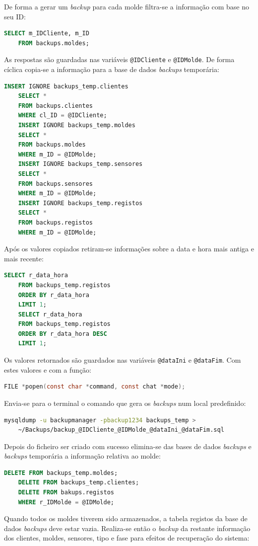 \documentclass[11pt,twoside,a4paper]{report}
\begin{document}
De forma a gerar um \textit{backup} para cada molde filtra-se a informação com base no seu ID:
\begin{lstlisting}[language = SQL]
	SELECT m_IDCliente, m_ID
	FROM backups.moldes;
\end{lstlisting}
As respostas são guardadas nas variáveis \texttt{@IDCliente} e \texttt{@IDMolde}. De forma cíclica copia-se a informação para a base de dados \textit{backups} temporária:
\begin{lstlisting}[language = SQL]
	INSERT IGNORE backups_temp.clientes
	SELECT *
	FROM backups.clientes
	WHERE cl_ID = @IDCliente;
	INSERT IGNORE backups_temp.moldes
	SELECT *
	FROM backups.moldes
	WHERE m_ID = @IDMolde;
	INSERT IGNORE backups_temp.sensores
	SELECT *
	FROM backups.sensores
	WHERE m_ID = @IDMolde;
	INSERT IGNORE backups_temp.registos
	SELECT *
	FROM backups.registos
	WHERE m_ID = @IDMolde;
\end{lstlisting}
Após os valores copiados retiram-se informações sobre a data e hora mais antiga e mais recente:
\begin{lstlisting}[language = SQL]
	SELECT r_data_hora
	FROM backups_temp.registos
	ORDER BY r_data_hora
	LIMIT 1;
	SELECT r_data_hora
	FROM backups_temp.registos
	ORDER BY r_data_hora DESC
	LIMIT 1;
\end{lstlisting}
Os valores retornados são guardados nas variáveis \texttt{@dataIni} e \texttt{@dataFim}. Com estes valores e com a função:
\begin{lstlisting}[language = C]
	FILE *popen(const char *command, const chat *mode);
\end{lstlisting}
Envia-se para o terminal o comando que gera os \textit{backups} num local predefinido:
\begin{lstlisting}[language = bash]
	mysqldump -u backupmanager -pbackup1234 backups_temp >
	~/Backups/backup_@IDCliente_@IDMolde_@dataIni_@dataFim.sql
\end{lstlisting}
Depois do ficheiro ser criado com sucesso elimina-se das bases de dados \textit{backups} e \textit{backups} temporária a informação relativa ao molde:
\begin{lstlisting}[language = SQL]
	DELETE FROM backups_temp.moldes;
	DELETE FROM backups_temp.clientes;
	DELETE FROM bakups.registos
	WHERE r_IDMolde = @IDMolde;
\end{lstlisting}
Quando todos os moldes tiverem sido armazenados, a tabela registos da base de dados \textit{backups} deve estar vazia. Realiza-se então o \textit{backup} da restante informação dos clientes, moldes, sensores, tipo e fase para efeitos de recuperação do sistema:
\end{document}
